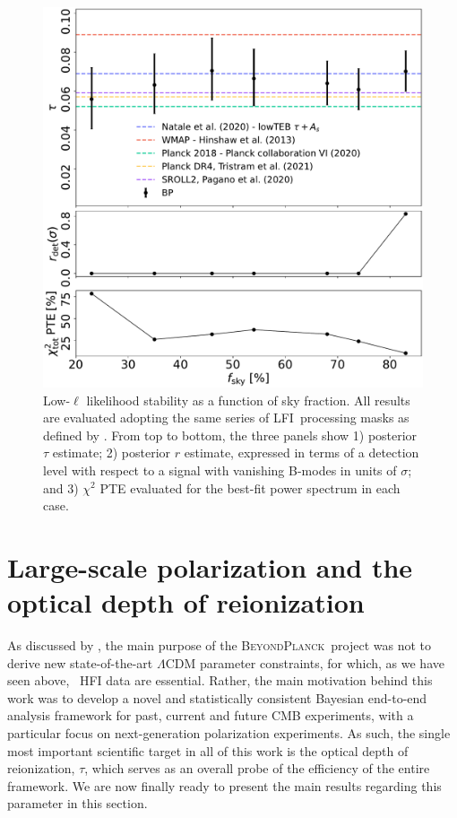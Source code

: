 \documentclass[twocolumn]{aa}
\newcommand{\BP}{\textsc{BeyondPlanck}}
\newcommand{\lfi}[0]{LFI}
\begin{document}
\begin{figure}[t]
	\center
	\includegraphics[width=\linewidth]{figs/lowl_fsky_tau_r_PTE_BI200_regP05.pdf}
  	\caption{Low-$\ell$ likelihood stability as a function of sky
          fraction. All results are evaluated adopting the same series
          of \lfi\ processing masks as defined by
          \citep{planck2016-l05}. From top to bottom, the three panels
          show 1) posterior $\tau$ estimate; 2) posterior $r$
          estimate, expressed in terms of a detection level with
          respect to a signal with vanishing B-modes in units of
          $\sigma$; and 3) $\chi^2$ PTE evaluated for the best-fit
          power spectrum in each case.}
	\label{fig:lowl_fsky}
\end{figure}



\section{Large-scale polarization and the optical depth of reionization}
\label{sec:low_ell_results}

As discussed by \citet{bp01}, the main purpose of the \BP\ project was
not to derive new state-of-the-art $\Lambda$CDM parameter constraints,
for which, as we have seen above, \Planck\ HFI data are
essential. Rather, the main motivation behind this work was to
develop a novel and statistically consistent Bayesian end-to-end
analysis framework for past, current and future CMB experiments, with
a particular focus on next-generation polarization experiments. As
such, the single most important scientific target in all of this work
is the optical depth of reionization, $\tau$, which serves as an
overall probe of the efficiency of the entire framework. We are now
finally ready to present the main results regarding this parameter in
this section.
\end{document}
